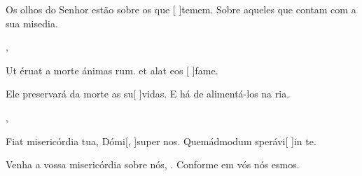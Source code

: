 {{\item Os olhos do Senhor estão sobre os que [ ]{te}mem. {\ResponsoriumC} Sobre aqueles que contam com a sua misedia.~\Responsorium},
{\item Ut éruat a morte ánimas rum. {\ResponsoriumC} et alat eos [ ]{fa}me.~\Responsorium}%
{\item Ele preservará da morte as su[ ]{vi}das. {\ResponsoriumC} E há de alimen\-tá-los na ria.~\Responsorium},
{\item Fiat misericórdia tua, Dómi[, ]{su}per nos. {\ResponsoriumC} Quemádmodum sperávi[ ]{in} te.~\Responsorium}%
{\item Venha a vossa misericórdia sobre nós, . {\ResponsoriumC} Conforme em vós nós esmos.~\Responsorium}
}